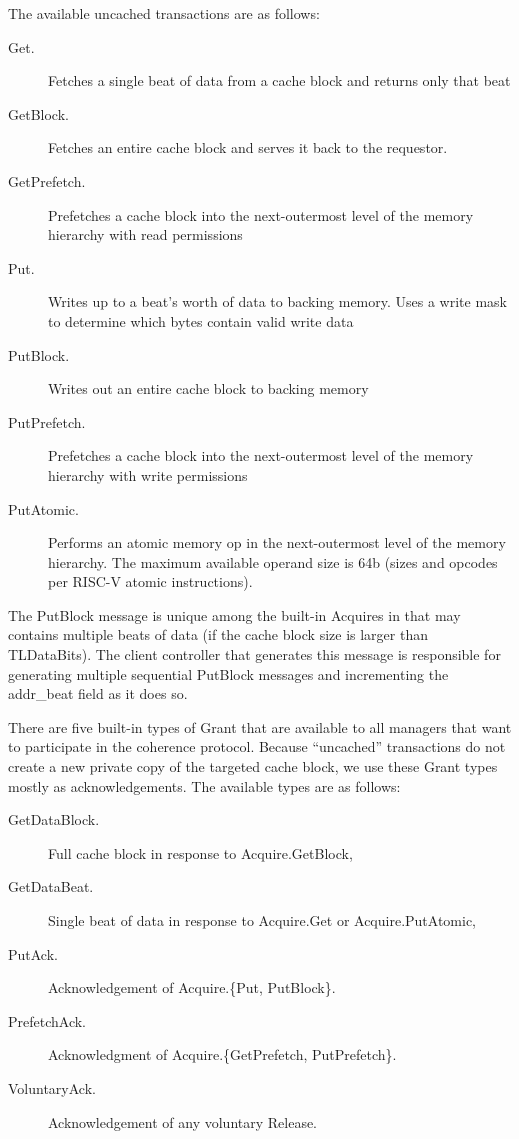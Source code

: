 The available uncached transactions are as follows:
\begin{description}
\item[Get.] Fetches a single beat of data from a cache block and returns only that beat
\item[GetBlock.] Fetches an entire cache block and serves it back to the requestor.
\item[GetPrefetch.]  Prefetches a cache block into the next-outermost level of the memory hierarchy with read permissions
\item[Put.] Writes up to a beat's worth of data to backing memory. Uses a write mask to determine which bytes contain valid write data
\item[PutBlock.] Writes out an entire cache block to backing memory
\item[PutPrefetch.]  Prefetches a cache block into the next-outermost level of the memory hierarchy with write permissions
\item[PutAtomic.] Performs an atomic memory op in the next-outermost level of the memory hierarchy. The maximum available operand size is 64b (sizes and opcodes per RISC-V atomic instructions).
\end{description}

The PutBlock message is unique among the built-in Acquires in that may contains multiple beats of data (if the cache block size is larger than TLDataBits).
The client controller that generates this message is responsible for generating multiple sequential PutBlock messages and incrementing the addr\_beat field as it does so.

There are five built-in types of Grant that are available to all managers that want to participate in the coherence protocol.
Because ``uncached'' transactions do not create a new private copy of the targeted cache block, we use these Grant types mostly as acknowledgements.
The available types are as follows:
\begin{description}
\item[GetDataBlock.] Full cache block in response to Acquire.GetBlock,
\item[GetDataBeat.] Single beat of data in response to Acquire.Get or Acquire.PutAtomic,
\item[PutAck.] Acknowledgement of Acquire.\{Put, PutBlock\}.
\item[PrefetchAck.] Acknowledgment of Acquire.\{GetPrefetch, PutPrefetch\}.
\item[VoluntaryAck.] Acknowledgement of any voluntary Release.
\end{description}

